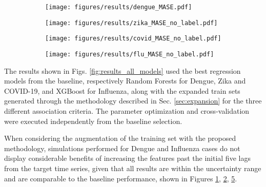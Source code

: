 \begin{figure}[h!]
	\centering
    \caption{\label{fig:results_all_models} MASE performance using varying number of features on the training set, with the amount represented by the numbers associated with the bar colors, for all investigated diseases. Brighter colors indicate the use of the dataset without anomalous cities ($z<4$).}
 
	\begin{subfigure}[t]{0.4\textwidth}
		\centering
		\texttt{[image: figures/results/dengue\_MASE.pdf]}
        \label{fig:res_dengue}
	\end{subfigure}
	\begin{subfigure}[t]{0.4\textwidth}
		\centering
		\texttt{[image: figures/results/zika\_MASE\_no\_label.pdf]}
        \label{fig:res_zika}
	\end{subfigure}
    \begin{subfigure}[t]{0.4\textwidth}
		\centering
		\texttt{[image: figures/results/covid\_MASE\_no\_label.pdf]}
        \label{fig:res_covid}
	\end{subfigure}
    \begin{subfigure}[t]{0.4\textwidth}
		\centering
		\texttt{[image: figures/results/flu\_MASE\_no\_label.pdf]}
        \label{fig:res_flu}
	\end{subfigure}
	
\end{figure}



The results shown in Figs. \ref{fig:results_all_models} used the best regression models from the baseline, respectively Random Forests for Dengue, Zika and COVID-19, and XGBoost for Influenza, along with the expanded train sets generated through the methodology described in Sec. \ref{sec:expansion} for the three different association criteria. The parameter optimization and cross-validation were executed independently from the baseline selection. 

When considering the augmentation of the training set with the proposed methodology, simulations performed for Dengue and Influenza cases do not display considerable benefits of increasing the features past the initial five lags from the target time series, given that all results are within the uncertainty range and are comparable to the baseline performance, shown in Figures \ref{fig:res_dengue}, \ref{fig:res_zika}, \ref{fig:res_flu}. 

